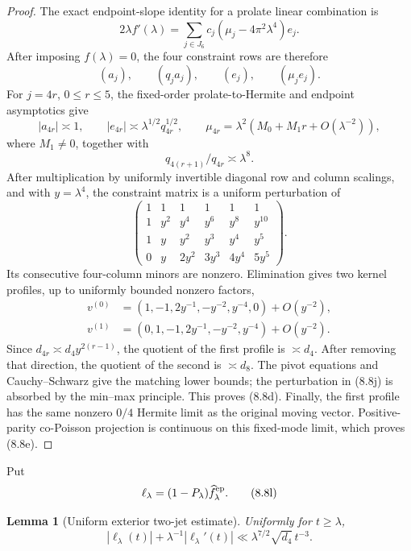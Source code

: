 \documentclass[11pt]{amsart}
\newtheorem{lemma}[theorem]{Lemma}
\theoremstyle{definition}
\theoremstyle{remark}
\begin{document}
\begin{proof}
The exact endpoint-slope identity for a prolate linear combination is
\[
 2\lambda f'(\lambda)
 =\sum_{j\in J_6}c_j(\mu_j-4\pi^2\lambda^4)e_j.
\tag{8.8f}
\]
After imposing \(f(\lambda)=0\), the four constraint rows are therefore
\[
 (a_j),\qquad(q_ja_j),\qquad(e_j),\qquad(\mu_je_j).
\tag{8.8g}
\]
For \(j=4r\), \(0\le r\le5\), the fixed-order prolate-to-Hermite and
endpoint asymptotics give
\[
 |a_{4r}|\asymp1,\qquad
 |e_{4r}|\asymp\lambda^{1/2}q_{4r}^{1/2},\qquad
 \mu_{4r}=\lambda^2(M_0+M_1r+O(\lambda^{-2})),
\tag{8.8h}
\]
where \(M_1\ne0\), together with
\[
 q_{4(r+1)}/q_{4r}\asymp\lambda^8.
\tag{8.8i}
\]
After multiplication by uniformly invertible diagonal row and column
scalings, and with \(y=\lambda^4\), the constraint matrix is a uniform
perturbation of
\[
 \begin{pmatrix}
 1&1&1&1&1&1\\
 1&y^2&y^4&y^6&y^8&y^{10}\\
 1&y&y^2&y^3&y^4&y^5\\
 0&y&2y^2&3y^3&4y^4&5y^5
 \end{pmatrix}.
\tag{8.8j}
\]
Its consecutive four-column minors are nonzero.  Elimination gives two
kernel profiles, up to uniformly bounded nonzero factors,
\[
 \begin{aligned}
 v^{(0)}&=(1,-1,2y^{-1},-y^{-2},y^{-4},0)+O(y^{-2}),\\
 v^{(1)}&=(0,1,-1,2y^{-1},-y^{-2},y^{-4})+O(y^{-2}).
 \end{aligned}
\tag{8.8k}
\]
Since \(d_{4r}\asymp d_4y^{2(r-1)}\), the quotient of the first
profile is \(\asymp d_4\).  After removing that direction, the quotient
of the second is \(\asymp d_8\).  The pivot equations and
Cauchy--Schwarz give the matching lower bounds; the perturbation in
(8.8j) is absorbed by the min--max principle.  This proves (8.8d).
Finally, the first profile has the same nonzero \(0/4\) Hermite limit as
the original moving vector.  Positive-parity co-Poisson projection is
continuous on this fixed-mode limit, which proves (8.8e).
\end{proof}

Put
\[
 \ell_\lambda=(1-P_\lambda)\widehat f_\lambda^{\rm ep}.
\tag{8.8l}
\]

\begin{lemma}[Uniform exterior two-jet estimate]
\label{lem:uniform-exterior-two-jet}
Uniformly for \(t\ge\lambda\),
\[
 \boxed{
 |\ell_\lambda(t)|+
 \lambda^{-1}|\ell_\lambda'(t)|
 \ll \lambda^{7/2}\sqrt{d_4}\,t^{-3}.}
\tag{8.8m}
\]
\end{lemma}
\end{document}
